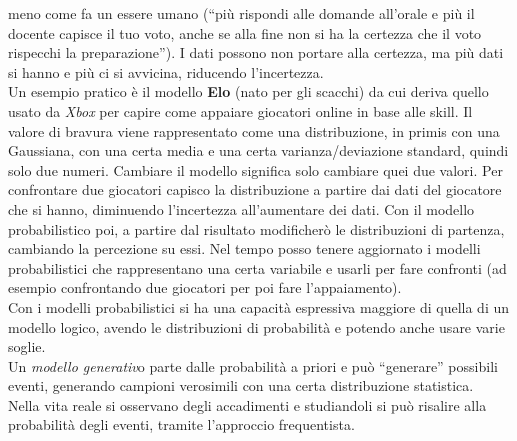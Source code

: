 \documentclass[a4paper,12pt, oneside]{book}
\begin{document}
meno come fa un essere umano (``più rispondi alle domande all'orale e più il
docente capisce il tuo voto, anche se alla fine non si ha la certezza che il
voto rispecchi la preparazione''). I dati possono non portare alla certezza, ma
più dati si hanno e più ci si avvicina, riducendo l'incertezza.\\
Un esempio pratico è il modello \textbf{Elo} (nato per gli scacchi) da cui
deriva quello usato da \textit{Xbox} per capire come appaiare giocatori online
in base alle skill. Il valore di bravura viene rappresentato come una
distribuzione, in primis con una Gaussiana, con una certa media e una certa
varianza/deviazione standard, quindi solo due numeri. Cambiare il modello
significa solo cambiare quei due valori. Per confrontare due giocatori capisco
la distribuzione a partire dai dati del giocatore che si hanno, diminuendo
l'incertezza all'aumentare dei dati. Con il modello probabilistico poi, a
partire dal risultato modificherò le distribuzioni di partenza, cambiando la
percezione su essi. Nel tempo posso tenere aggiornato i modelli probabilistici
che rappresentano una certa variabile e usarli per fare confronti (ad esempio
confrontando due giocatori per poi fare l'appaiamento).\\
Con i modelli probabilistici si ha una capacità espressiva maggiore di quella di
un modello logico, avendo le distribuzioni di probabilità e potendo anche usare
varie soglie.\\
Un \textit{modello generativ}o parte dalle probabilità a priori e può
``generare'' possibili eventi, generando campioni verosimili con una certa
distribuzione statistica. \\
Nella vita reale si osservano degli accadimenti e studiandoli si può risalire
alla probabilità degli eventi, tramite l'approccio frequentista.
\end{document}
